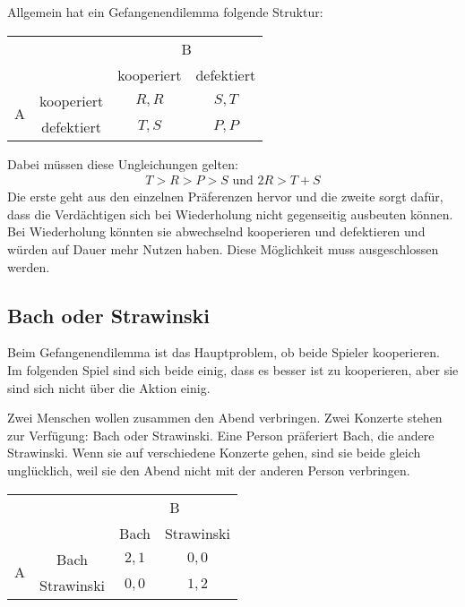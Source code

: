Allgemein hat ein Gefangenendilemma folgende Struktur:
\begin{center}
  \begin{tabular}{cccc}
    & & \multicolumn{2}{c}{B}\\
    & & kooperiert & defektiert\\
    \cmidrule{3-4}
    \multirow{2}{*}{A}
      & kooperiert & $R, R$ & $S, T$\\
    \cmidrule{3-4}
      & defektiert & $T, S$ & $P, P$\\
    \cmidrule{3-4}
  \end{tabular}
\end{center}
Dabei müssen diese Ungleichungen gelten:
\begin{align*}
  T > R > P > S \text{ und } 2R > T + S
\end{align*}
Die erste geht aus den einzelnen Präferenzen hervor und die zweite sorgt dafür, dass die
Verdächtigen sich bei Wiederholung nicht gegenseitig ausbeuten können.
Bei Wiederholung könnten sie abwechselnd kooperieren und defektieren und würden auf Dauer
mehr Nutzen haben.
Diese Möglichkeit muss ausgeschlossen werden.

\subsection{Bach oder Strawinski}%
\label{sub:bach_oder_strawinski}

Beim Gefangenendilemma ist das Hauptproblem, ob beide Spieler kooperieren.
Im folgenden Spiel sind sich beide einig, dass es besser ist zu kooperieren, aber sie sind
sich nicht über die Aktion einig.

Zwei Menschen wollen zusammen den Abend verbringen.
Zwei Konzerte stehen zur Verfügung: Bach oder Strawinski.
Eine Person präferiert Bach, die andere Strawinski.
Wenn sie auf verschiedene Konzerte gehen, sind sie beide gleich unglücklich, weil sie den
Abend nicht mit der anderen Person verbringen.
\begin{center}
  \begin{tabular}{cccc}
    & & \multicolumn{2}{c}{B}\\
    & & Bach & Strawinski\\
    \cmidrule{3-4}
    \multirow{2}{*}{A}
      & Bach & $2, 1$ & $0, 0$\\
    \cmidrule{3-4}
      & Strawinski & $0, 0$ & $1, 2$\\
    \cmidrule{3-4}
  \end{tabular}
\end{center}

